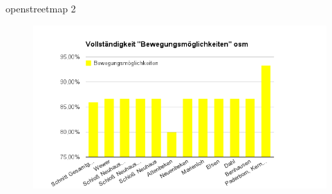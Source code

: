 \begin{frame}[t]{openstreetmap 2}
 \begin{figure}
  \centering
  \includegraphics[scale=0.5]{section_paderborn_osm_move.png}
 \end{figure}
\end{frame}